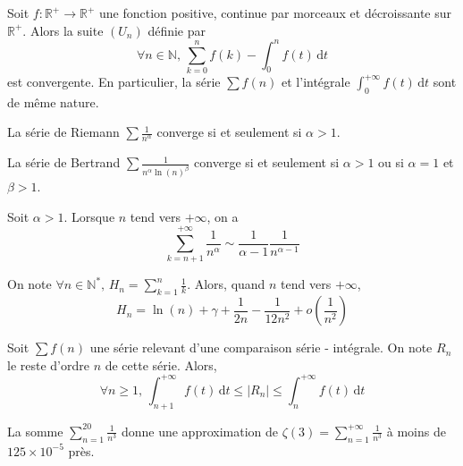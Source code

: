 
  \begin{proposition}
    Soit $f : \mathbb{R}^+ \rightarrow \mathbb{R}^+$ une fonction positive, continue par morceaux et décroissante sur $\mathbb{R}^+$. Alors la suite $(U_n)$ définie par
    \[ \forall n \in \mathbb{N}, \, \sum_{k=0}^n f(k) - \int_0^n f(t) \, \mathrm{d}t \]
    est convergente. En particulier, la série $\sum f(n)$ et l'intégrale $\int_0^{+\infty} f(t) \, \mathrm{d}t$ sont de même nature.
  \end{proposition}

  \begin{example}
    La série de Riemann $\sum \frac{1}{n^\alpha}$ converge si et seulement si $\alpha > 1$.
  \end{example}

  \begin{example}
    La série de Bertrand $\sum \frac{1}{n^\alpha \ln(n)^\beta}$ converge si et seulement si $\alpha > 1$ ou si $\alpha = 1$ et $\beta > 1$.
  \end{example}


  \begin{lemma}
    Soit $\alpha > 1$. Lorsque $n$ tend vers $+\infty$, on a
    \[ \sum_{k=n+1}^{+\infty} \frac{1}{n^\alpha} \sim \frac{1}{\alpha - 1} \frac{1}{n^{\alpha - 1}} \]
  \end{lemma}


  \begin{application}
    On note $\forall n \in \mathbb{N}^*, \, H_n = \sum_{k=1}^{n} \frac{1}{k}$. Alors, quand $n$ tend vers $+\infty$,
    \[ H_n = \ln(n) + \gamma + \frac{1}{2n} - \frac{1}{12n^2} + o\left( \frac{1}{n^2} \right) \]
  \end{application}


  \begin{proposition}
    Soit $\sum f(n)$ une série relevant d'une comparaison série - intégrale. On note $R_n$ le reste d'ordre $n$ de cette série. Alors,
    \[ \forall n \geq 1, \, \int_{n+1}^{+\infty} f(t) \, \mathrm{d}t \leq |R_n| \leq \int_{n}^{+\infty} f(t) \, \mathrm{d}t \]
  \end{proposition}

  \begin{example}
    La somme $\sum_{n=1}^{20} \frac{1}{n^3}$ donne une approximation de $\zeta(3) = \sum_{n=1}^{+\infty} \frac{1}{n^3}$ à moins de $125 \times 10^{-5}$ près.
  \end{example}

